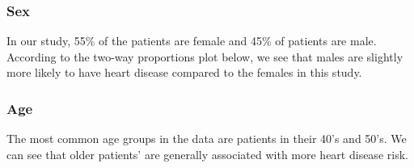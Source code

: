 \documentclass[10pt]{article}
\begin{document}
\subsubsection*{Sex}

In our study, 55\% of the patients are female and 45\% of patients are male. According to the two-way proportions plot below, we see that males are slightly more likely to have heart disease compared to the females in this study. 

\begin{figure}[ht!]
\hspace*{\fill}
\centering
{}\hspace{2em}%
%
\hspace*{\fill}
\end{figure}

\subsubsection*{Age}

The most common age groups in the data are patients in their 40's and 50's. We can see that older patients' are generally associated with more heart disease risk.
\end{document}
